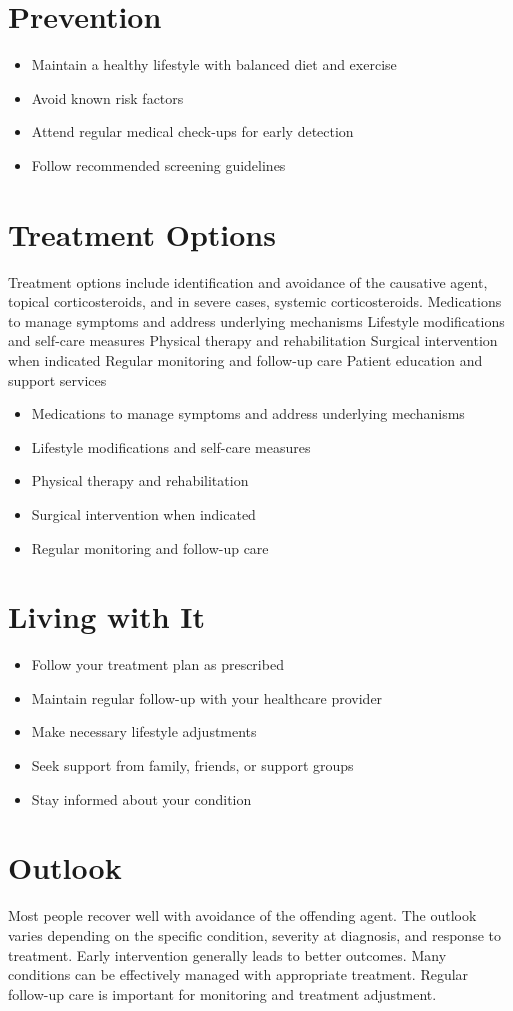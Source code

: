 \section{Prevention}
\begin{itemize}[noitemsep]
  \item Maintain a healthy lifestyle with balanced diet and exercise
  \item Avoid known risk factors
  \item Attend regular medical check-ups for early detection
  \item Follow recommended screening guidelines
\end{itemize}
\section{Treatment Options}
Treatment options include identification and avoidance of the causative agent, topical corticosteroids, and in severe cases, systemic corticosteroids. Medications to manage symptoms and address underlying mechanisms Lifestyle modifications and self-care measures Physical therapy and rehabilitation Surgical intervention when indicated Regular monitoring and follow-up care Patient education and support services

\begin{itemize}[noitemsep]
  \item Medications to manage symptoms and address underlying mechanisms
  \item Lifestyle modifications and self-care measures
  \item Physical therapy and rehabilitation
  \item Surgical intervention when indicated
  \item Regular monitoring and follow-up care
\end{itemize}
\section{Living with It}
\begin{itemize}[noitemsep]
  \item Follow your treatment plan as prescribed
  \item Maintain regular follow-up with your healthcare provider
  \item Make necessary lifestyle adjustments
  \item Seek support from family, friends, or support groups
  \item Stay informed about your condition
\end{itemize}
\section{Outlook}
Most people recover well with avoidance of the offending agent. The outlook varies depending on the specific condition, severity at diagnosis, and response to treatment. Early intervention generally leads to better outcomes. Many conditions can be effectively managed with appropriate treatment. Regular follow-up care is important for monitoring and treatment adjustment.
